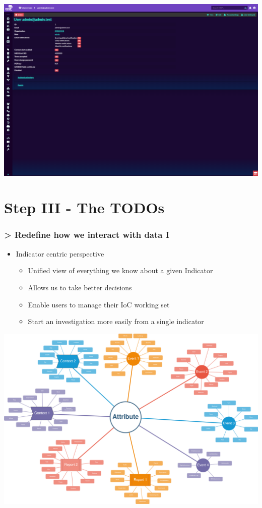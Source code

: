 \begin{frame}
\begin{minipage}{0.5\textwidth}
        \vspace{1em}
        \includegraphics[width=0.9\linewidth]{pictures/theme4.png}
    \end{minipage}
\end{frame}


\section{Step III - The TODOs}
\begin{frame}
    \frametitle{> Redefine how we interact with data I}
    \begin{itemize}
        \item Indicator centric perspective
        \begin{itemize}
            \item Unified view of everything we know about a given Indicator
            \item Allows us to take better decisions
            \item Enable users to manage their IoC working set
            \item Start an investigation more easily from a single indicator
        \end{itemize}
    \end{itemize}
    \begin{center}
        \includegraphics[width=0.7\linewidth]{pictures/attribute-centric.png}
    \end{center}
\end{frame}

